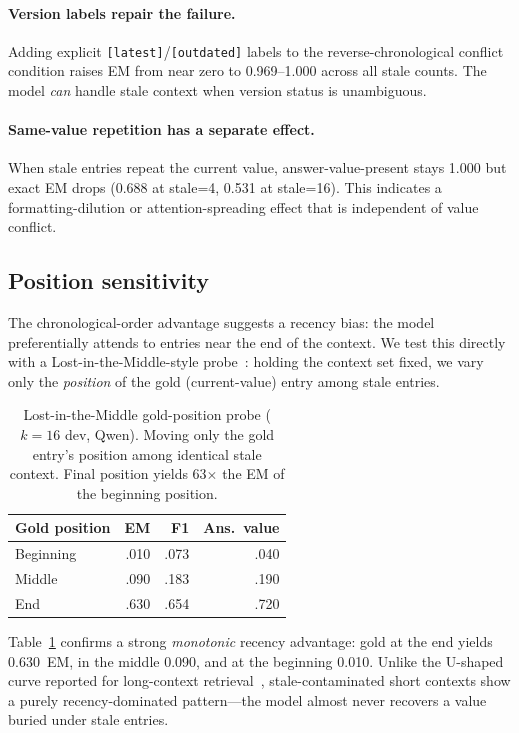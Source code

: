\documentclass[11pt,twocolumn]{article}
\begin{document}
\paragraph{Version labels repair the failure.}
Adding explicit \texttt{[latest]}/\texttt{[outdated]} labels to the reverse-chronological conflict condition raises EM from near zero to 0.969--1.000 across all stale counts.
The model \emph{can} handle stale context when version status is unambiguous.

\paragraph{Same-value repetition has a separate effect.}
When stale entries repeat the current value, answer-value-present stays 1.000 but exact EM drops (0.688 at stale=4, 0.531 at stale=16).
This indicates a formatting-dilution or attention-spreading effect that is independent of value conflict.

\subsection{Position sensitivity}
\label{sec:position-probe}

The chronological-order advantage suggests a recency bias: the model preferentially attends to entries near the end of the context.
We test this directly with a Lost-in-the-Middle-style probe~\citep{lost_in_the_middle}: holding the context set fixed, we vary only the \emph{position} of the gold (current-value) entry among stale entries.

\begin{table}[t]
\centering
\small
\begin{tabular}{lrrr}
\toprule
Gold position & EM & F1 & Ans.\ value \\
\midrule
Beginning & .010 & .073 & .040 \\
Middle    & .090 & .183 & .190 \\
End       & .630 & .654 & .720 \\
\bottomrule
\end{tabular}
\caption{Lost-in-the-Middle gold-position probe (\(k{=}16\) dev, Qwen). Moving only the gold entry's position among identical stale context. Final position yields 63$\times$ the EM of the beginning position.}
\label{tab:litm-probe}
\end{table}

Table~\ref{tab:litm-probe} confirms a strong \emph{monotonic} recency advantage: gold at the end yields 0.630~EM, in the middle 0.090, and at the beginning 0.010.
Unlike the U-shaped curve reported for long-context retrieval~\citep{lost_in_the_middle}, stale-contaminated short contexts show a purely recency-dominated pattern---the model almost never recovers a value buried under stale entries.
\end{document}
